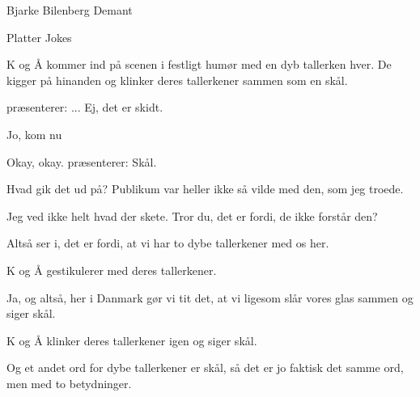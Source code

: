 \begin{Footer}
	Bjarke Bilenberg Demant
\end{Footer}


\begin{Sketch}{Platter Jokes}

\begin{Regi}
	K og Å kommer ind på scenen i festligt humør med en dyb tallerken hver. De kigger på hinanden og klinker deres tallerkener sammen som en skål.
\end{Regi}

\begin{Replik}[S]
	\TKET præsenterer: ... Ej, det er skidt.
\end{Replik}

\begin{Replik}[K]
	Jo, kom nu 
\end{Replik}


\begin{Replik}[S]
	Okay, okay. \TKET præsenterer: Skål. 
\end{Replik}

\begin{Replik}[K]
	Hvad gik det ud på? Publikum var heller ikke så vilde med den, som jeg troede.
\end{Replik}


\begin{Replik}[Å]
	Jeg ved ikke helt hvad der skete. Tror du, det er fordi, de ikke forstår den?
\end{Replik}

\begin{Replik}[K]
	 Altså ser i, det er fordi, at vi har to dybe tallerkener med os her.
\end{Replik}

\begin{Regi}
	K og Å gestikulerer med deres tallerkener. 
\end{Regi}

\begin{Replik}[Å]
	Ja, og altså, her i Danmark gør vi tit det, at vi ligesom slår vores glas sammen og siger skål.
\end{Replik}

\begin{Regi}
	K og Å klinker deres tallerkener igen og siger skål.
\end{Regi}

\begin{Replik}[Å]
	Og et andet ord for dybe tallerkener er skål, så det er jo faktisk det samme ord, men med to betydninger.
\end{Replik}


\end{Sketch}
